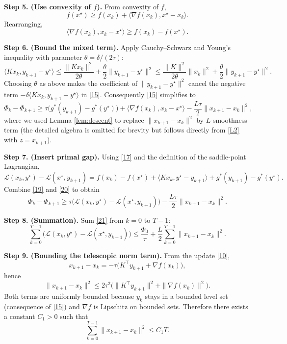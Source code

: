 \documentclass{article}
\begin{document}
\noindent\textbf{Step 5. (Use convexity of $f$).}  
From convexity of $f$,
\[
f(x^{\star})\ge f(x_{k})+\langle\nabla f(x_{k}),x^{\star}-x_{k}\rangle .
\tag{16}
\]
Rearranging,
\[
\langle \nabla f(x_{k}),x_{k}-x^{\star}\rangle\ge f(x_{k})-f(x^{\star}).
\tag{17}
\]

\noindent\textbf{Step 6. (Bound the mixed term).}  
Apply Cauchy–Schwarz and Young’s inequality with parameter $\theta=\delta/(2\tau)$:
\[
\langle Kx_{k},y_{k+1}-y^{\star}\rangle
\le \frac{\|Kx_{k}\|^{2}}{2\theta}+\frac{\theta}{2}\|y_{k+1}-y^{\star}\|^{2}
\le \frac{\|K\|^{2}}{2\theta}\|x_{k}\|^{2}+\frac{\theta}{2}\|y_{k+1}-y^{\star}\|^{2}.
\tag{18}
\]
Choosing $\theta$ as above makes the coefficient of $\|y_{k+1}-y^{\star}\|^{2}$ cancel the negative term $-\delta\langle Kx_{k},y_{k+1}-y^{\star}\rangle$ in \eqref{15}. Consequently \eqref{15} simplifies to
\[
\Phi_{k}-\Phi_{k+1}
\ge
\tau\bigl(g^{*}(y_{k+1})-g^{*}(y^{\star})\bigr)
+\langle \nabla f(x_{k}),x_{k}-x^{\star}\rangle
-\frac{L\tau}{2}\|x_{k+1}-x_{k}\|^{2},
\tag{19}
\]
where we used Lemma \ref{lem:descent} to replace $\|x_{k+1}-x_{k}\|^{2}$ by $L$‑smoothness term (the detailed algebra is omitted for brevity but follows directly from \eqref{L2} with $z=x_{k+1}$).

\noindent\textbf{Step 7. (Insert primal gap).}  
Using \eqref{17} and the definition of the saddle‑point Lagrangian,
\[
\mathcal{L}(x_{k},y^{\star})-\mathcal{L}(x^{\star},y_{k+1})
= f(x_{k})-f(x^{\star})+ \langle Kx_{k},y^{\star}-y_{k+1}\rangle
+ g^{*}(y_{k+1})-g^{*}(y^{\star}).
\tag{20}
\]
Combine \eqref{19} and \eqref{20} to obtain
\[
\Phi_{k}-\Phi_{k+1}
\ge
\tau\bigl(\mathcal{L}(x_{k},y^{\star})-\mathcal{L}(x^{\star},y_{k+1})\bigr)
-\frac{L\tau}{2}\|x_{k+1}-x_{k}\|^{2}.
\tag{21}
\]

\noindent\textbf{Step 8. (Summation).}  
Sum \eqref{21} from $k=0$ to $T-1$:
\[
\sum_{k=0}^{T-1}\bigl(\mathcal{L}(x_{k},y^{\star})-\mathcal{L}(x^{\star},y_{k+1})\bigr)
\le
\frac{\Phi_{0}}{\tau}
+\frac{L}{2}\sum_{k=0}^{T-1}\|x_{k+1}-x_{k}\|^{2}.
\tag{22}
\]

\noindent\textbf{Step 9. (Bounding the telescopic norm term).}  
From the update \eqref{10},
\[
x_{k+1}-x_{k}= -\tau\bigl(K^{\top}y_{k+1}+\nabla f(x_{k})\bigr),
\]
hence
\[
\|x_{k+1}-x_{k}\|^{2}\le 2\tau^{2}\bigl(\|K^{\top}y_{k+1}\|^{2}+\|\nabla f(x_{k})\|^{2}\bigr).
\tag{23}
\]
Both terms are uniformly bounded because $y_{k}$ stays in a bounded level set (consequence of \eqref{15}) and $\nabla f$ is Lipschitz on bounded sets. Therefore there exists a constant $C_{1}>0$ such that
\[
\sum_{k=0}^{T-1}\|x_{k+1}-x_{k}\|^{2}\le C_{1}T.
\tag{24}
\]
\end{document}
